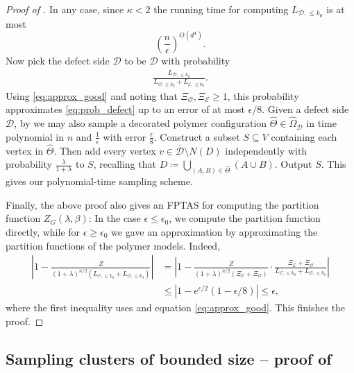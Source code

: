 \documentclass[reqno,a4paper,11pt]{amsart}
\newcommand{\cD}{\mathcal{D}}
\newcommand{\cE}{\mathcal{E}}
\newcommand{\cO}{\mathcal{O}}
\newcommand{\lam}{\lambda}
\newcommand{\ex}{\kappa}
\begin{document}
\begin{proof}[Proof of ]
    In any case, since $\ex<2$ the running time for computing $L_{\cD,\leq k_{0}}$ is at most
    \begin{equation*}\label{eqn:cluster_time}
        \left(\frac{n}{\epsilon}\right)^{O(d^4)}.
    \end{equation*}  
    Now pick the defect side $\bm{\cD}$ to be $\cD$ with probability
    \begin{align*}
    \frac{L_{\cD, \leq k_0}}{L_{\cO, \leq k_0} + L_{\cE, \leq k_0}}.
    \end{align*}
    Using \eqref{eq:approx_good} and noting that $\Xi_{\cO}, \Xi_{\cE} \geq 1$, this probability approximates \eqref{eq:prob_defect} up to an error of at most $\epsilon/8$.
    Given a defect side $\cD$, by  we may also sample a decorated polymer configuration $\hat{\Theta} \in \hat{\Omega}_{\cD}$ in time polynomial in $n$ and $\frac{1}{\epsilon}$ with error $\frac{\epsilon}{8}$.
    Construct a subset $S \subseteq V$ containing each vertex in $\hat{\Theta}$. Then add every vertex $v\in\overline{\cD} \setminus N(D)$ independently with probability $\frac{\lam}{1+\lam}$ to $S$, recalling that $D \coloneqq \bigcup_{(A,B) \in \hat{\Theta}}(A\cup B)$. Output $S$. This gives our polynomial-time sampling scheme.
    
    Finally, the above proof also gives an FPTAS for computing the partition function $Z_G(\lam,\beta)$: In the case $\epsilon\leq\epsilon_0$, we compute the partition function directly, while for $\epsilon\geq\epsilon_0$ we gave an approximation by approximating the partition functions of the polymer models. Indeed,
    \begin{align*}
        \left|1-\frac{Z}{(1+\lam)^{n/2}(L_{\cE,\leq{k_0}}+L_{\cO,\leq{k_0}})}\right| &=\left|1-\frac{Z}{(1+\lam)^{n/2}(\Xi_{\cE}+\Xi_{\cO})}\cdot\frac{\Xi_{\cE}+\Xi_{\cO}}{L_{\cE,\leq{k_0}}+L_{\cO,\leq{k_0}}}\right|\\
        &\leq |1-e^{\epsilon/2}(1-\epsilon/8)|\leq\epsilon,
    \end{align*}
    where the first inequality uses  and equation \eqref{eq:approx_good}. This finishes the proof.
\end{proof}


\subsection{Sampling clusters of bounded size -- proof of } \label{sec:sample_small_cluster}
\end{document}
